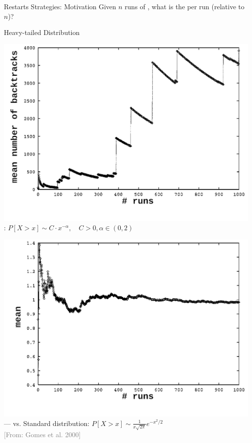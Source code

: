 \documentclass[t]{sdqbeamer}
\begin{document}
\begin{frame}{Restarts Strategies: Motivation}
Given $n$ runs of , what is the  per run (relative to $n$)?
\begin{block}{Heavy-tailed Distribution}
\begin{minipage}{0.5\textwidth}
	\centering
		\includegraphics[width=.7\textwidth]{figures/l04/heavy-tail-1}\\
		:
		$P[X > x] \sim C \cdot x^{-\alpha}, \quad C > 0, \alpha \in (0,2)$
\end{minipage}%
\begin{minipage}{0.5\textwidth}
	\centering
	\includegraphics[width=.7\textwidth]{figures/l04/heavy-tail-2}\\
	--- vs. Standard distribution: 
	$P[X > x] \sim \frac{1}{x\sqrt{2\pi}}e^{-x^2/2}$\\[1ex]
	\hfill\small\textcolor{gray}{[From: Gomes et al. 2000]}
\end{minipage}
\end{block}
\end{frame}
\end{document}
